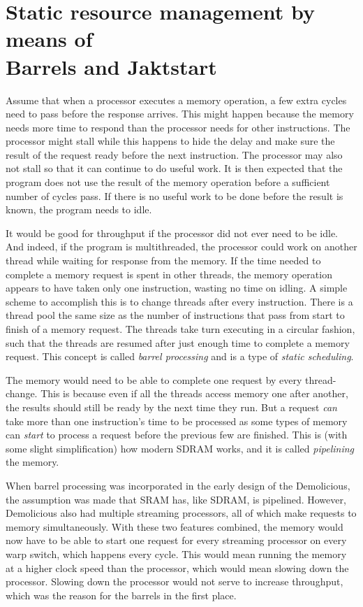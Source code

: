 \documentclass[../main/report.tex]{subfiles}
\begin{document}
\section{Static resource management by means of\\
Barrels and Jaktstart}

Assume that when a processor executes a memory operation, a few extra cycles need to pass before the response arrives.
This might happen because the memory needs more time to respond than the processor needs for other instructions.
The processor might stall while this happens to hide the delay and make sure the result of the request ready before the next instruction.
The processor may also not stall so that it can continue to do useful work.
It is then expected that the program does not use the result of the memory operation before a sufficient number of cycles pass.
If there is no useful work to be done before the result is known, the program needs to idle.

It would be good for throughput if the processor did not ever need to be idle.
And indeed, if the program is multithreaded, the processor could work on another thread while waiting for response from the memory.
If the time needed to complete a memory request is spent in other threads, the memory operation appears to have taken only one instruction, wasting no time on idling.
A simple scheme to accomplish this is to change threads after every instruction.
There is a thread pool the same size as the number of instructions that pass from start to finish of a memory request.
The threads take turn executing in a circular fashion, such that the threads are resumed after just enough time to complete a memory request.
This concept is called \emph{barrel processing} and is a type of \emph{static scheduling}.

The memory would need to be able to complete one request by every thread-change.
This is because even if all the threads access memory one after another, the results should still be ready by the next time they run.
But a request \emph{can} take more than one instruction's time to be processed as some types of memory can \emph{start} to process a request before the previous few are finished.
This is (with some slight simplification) how modern SDRAM works, and it is called \emph{pipelining} the memory.

When barrel processing was incorporated in the early design of the Demolicious, the assumption was made that SRAM has, like SDRAM, is pipelined.
However, Demolicious also had multiple streaming processors, all of which make requests to memory simultaneously.
With these two features combined, the memory would now have to be able to start one request for every streaming processor on every warp switch, which happens every cycle.
This would mean running the memory at a higher clock speed than the processor, which would mean slowing down the processor.
Slowing down the processor would not serve to increase throughput, which was the reason for the barrels in the first place.
\end{document}
